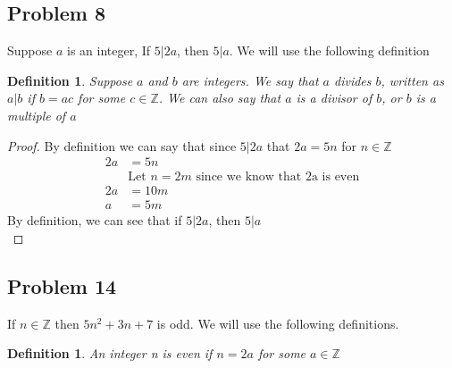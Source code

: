 \documentclass[12pt]{article}
\newtheorem{definition}{Definition}
\newtheorem*{definition*}{Definition}
\newcommand{\Z}{\mathbb{Z}}
\begin{document}
\subsection*{Problem 8}
Suppose $a$ is an integer, If $5|2a$, then $5|a$. We will use the following definition
\begin{definition*}
Suppose $a$ and $b$ are integers. We say that $a$ divides $b$, written as $a|b$ if $b = ac$ for some $c \in \Z$. We can also say that $a$ is a divisor of $b$, or $b$ is a multiple of $a$
\end{definition*}
\begin{proof}

By definition we can say that since $5|2a$ that $2a = 5n$ for $n \in \Z$
\begin{align*}
2a &= 5n\\
&\text{Let } n = 2m \text{ since we know that 2a is even}\\
2a &= 10m\\
a &= 5m
\end{align*}
By definition, we can see that if $5|2a$, then $5|a$\\
\end{proof}


\subsection*{Problem 14}
If $n \in \Z$ then $5n^2 + 3n + 7$ is odd. We will use the following definitions.\\

\begin{definition}
An integer n is even if $n = 2a$ for some $a \in \Z$
\end{definition}
\end{document}
